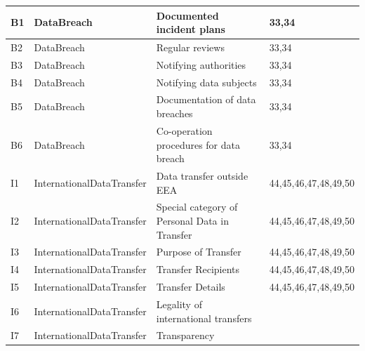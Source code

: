 \begin{center}
\begin{tabularx}{\textwidth}{|l|l|X|l|}
B1 & DataBreach & Documented incident plans & 33,34 \\ \hline
B2 & DataBreach & Regular reviews & 33,34 \\ \hline
B3 & DataBreach & Notifying authorities & 33,34 \\ \hline
B4 & DataBreach & Notifying data subjects & 33,34 \\ \hline
B5 & DataBreach & Documentation of data breaches & 33,34 \\ \hline
B6 & DataBreach & Co-operation procedures for data breach & 33,34 \\ \hline
I1 & InternationalDataTransfer & Data transfer outside EEA & 44,45,46,47,48,49,50 \\ \hline
I2 & InternationalDataTransfer & Special category of Personal Data in Transfer & 44,45,46,47,48,49,50 \\ \hline
I3 & InternationalDataTransfer & Purpose of Transfer & 44,45,46,47,48,49,50 \\ \hline
I4 & InternationalDataTransfer & Transfer Recipients & 44,45,46,47,48,49,50 \\ \hline
I5 & InternationalDataTransfer & Transfer Details & 44,45,46,47,48,49,50 \\ \hline
I6 & InternationalDataTransfer & Legality of international transfers &  \\ \hline
I7 & InternationalDataTransfer & Transparency & \\ \hline
\end{tabularx}
\end{center}

